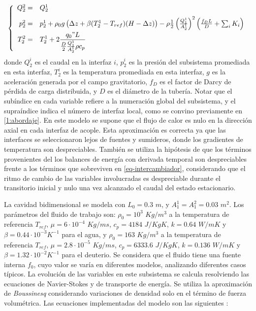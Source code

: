 \begin{equation}
\left\{ \begin{array}{rl}
Q_2^{2} =& Q_2^{1} \\ [0.2cm]
p_2^2 =&  p_2^1 + \rho_0 g \left ( \Delta z + \beta (T_2^1 - T_{ref}) (H-\Delta z) \right ) - \rho \frac{1}{2} \left( \frac{Q_1^1}{A_2^1} \right)^2  \left( \frac {f_D L} {D} + \sum_i K_i \right)  \\ [0.2cm]
\displaystyle T_2^2 =& \displaystyle T_2^1 + 2 \frac {q_0" L}{\frac{D}{2} \frac{Q_1^1}{A_2^1}\rho c_p}
\label{eq-intercambiador}
\end{array}
\right.
\end{equation}
donde $Q_2^i$ es el caudal en la interfaz $i$,
$p_2^i$ es la presión del subsistema promediada en esta interfaz,
$T_2^i$ es la temperatura promediada en esta interfaz,
$g$ es la aceleración generada por el campo gravitatorio,
$f_D$ es el factor de Darcy de pérdida de carga distribuida,
y $D$ es el diámetro de la tubería.
Notar que el subíndice en cada variable refiere a la numeración global del subsistema, y el supraíndice indica el número de interfaz local,
como se convino previamente en \ref{1:abordaje}.
En este modelo se supone que el flujo de calor es nulo en la dirección axial en cada interfaz de acople.
Esta aproximación es correcta ya que las interfaces se seleccionaron lejos de fuentes y sumideros, donde los gradientes de temperatura son despreciables.
También se utiliza la hipótesis de que los términos provenientes del los balances de energía con derivada temporal son despreciables frente a los términos que sobreviven en \ref{eq-intercambiador},
considerando que el ritmo de cambio de las variables involucradas es despreciable durante el transitorio inicial y nulo una vez alcanzado el caudal del estado estacionario.

La cavidad bidimensional se modela con $L_0=0.3$ $m$, y $A_1^1=A_1^2=0.03$ $m^2$.
Los parámetros del fluido de trabajo son: $\rho_0=10^3$ $Kg/m^3$ a la temperatura de referencia $T_{ref}$,
$\mu=6\cdot 10^{-4}$ $Kg/ms$, $c_p=4184$ $J/KgK$, 
$k=0.64$ $W/mK$ y $\beta=0.44\cdot10^{-3}K^{-1}$ para el agua, y
$\rho_0=163$ $Kg/m^3$ a la temperatura de referencia $T_{ref}$,
$\mu=2.8\cdot 10^{-5}$ $Kg/ms$, $c_p=6333.6$ $J/KgK$, 
$k=0.136$ $W/mK$ y $\beta=1.32\cdot10^{-2}K^{-1}$ para el deuterio.
Se considera que el fluido tiene una fuente interna $f_0$, cuyo valor se varía en diferentes modelos,
analizando diferentes casos típicos.
La evolución de las variables en este subsistema se calcula resolviendo las ecuaciones de Navier-Stokes 
y de transporte de energía.
Se utiliza la aproximación de \textit{Boussinesq} considerando variaciones de densidad solo en el término de fuerza volumétrica.
Las ecuaciones implementadas del modelo son las siguientes \cite{gunzburger} \cite{kays}:

